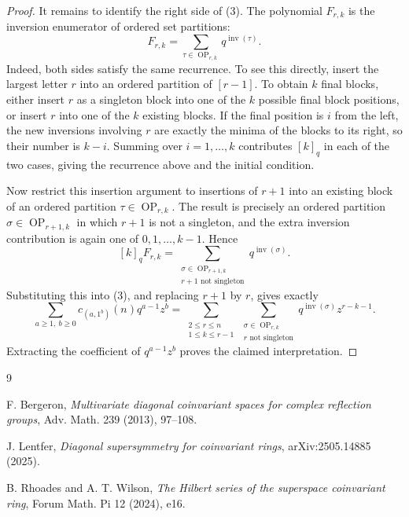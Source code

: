 \documentclass[12pt]{article}
\newcommand{\OP}{\operatorname{OP}}
\newcommand{\inv}{\operatorname{inv}}
\begin{document}
\begin{proof}
It remains to identify the right side of (3).  The polynomial \(F_{r,k}\) is
the inversion enumerator of ordered set partitions:
\[
        F_{r,k}=\sum_{\tau\in \OP_{r,k}}q^{\inv(\tau)}.                \tag{4}
\]
Indeed, both sides satisfy the same recurrence.  To see this directly, insert
the largest letter \(r\) into an ordered partition of \([r-1]\).  To obtain
\(k\) final blocks, either insert \(r\) as a singleton block into one of the
\(k\) possible final block positions, or insert \(r\) into one of the \(k\)
existing blocks.  If the final position is \(i\) from the left, the new
inversions involving \(r\) are exactly the minima of the blocks to its right, so
their number is \(k-i\).  Summing over \(i=1,\ldots,k\) contributes
\([k]_q\) in each of the two cases, giving the recurrence above and the initial
condition.

Now restrict this insertion argument to insertions of \(r+1\) into an existing
block of an ordered partition \(\tau\in\OP_{r,k}\).  The result is precisely an
ordered partition \(\sigma\in\OP_{r+1,k}\) in which \(r+1\) is not a singleton,
and the extra inversion contribution is again one of \(0,1,\ldots,k-1\).
Hence
\[
 [k]_qF_{r,k}
 =
 \sum_{\substack{\sigma\in\OP_{r+1,k}\\ r+1\text{ not singleton}}}
      q^{\inv(\sigma)} .
\]
Substituting this into (3), and replacing \(r+1\) by \(r\), gives exactly
\[
\sum_{a\ge1,\ b\ge0}c_{(a,1^b)}(n)q^{a-1}z^b
=
\sum_{\substack{2\le r\le n\\1\le k\le r-1}}
\sum_{\substack{\sigma\in \OP_{r,k}\\r\text{ not singleton}}}
q^{\inv(\sigma)}z^{r-k-1}.
\]
Extracting the coefficient of \(q^{a-1}z^b\) proves the claimed interpretation.
\end{proof}

\begin{thebibliography}{9}

F. Bergeron,
\emph{Multivariate diagonal coinvariant spaces for complex reflection groups},
Adv. Math. 239 (2013), 97--108.

J. Lentfer,
\emph{Diagonal supersymmetry for coinvariant rings},
arXiv:2505.14885 (2025).

B. Rhoades and A. T. Wilson,
\emph{The Hilbert series of the superspace coinvariant ring},
Forum Math. Pi 12 (2024), e16.

\end{thebibliography}
\end{document}
